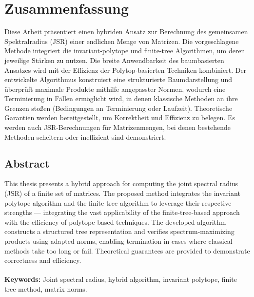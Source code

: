 \chapter*{Zusammenfassung}

Diese Arbeit präsentiert einen hybriden Ansatz zur Berechnung des gemeinsamen Spektralradius (JSR) einer endlichen Menge von Matrizen. Die vorgeschlagene Methode integriert die invariant-polytope und finite-tree Algorithmen, um deren jeweilige Stärken zu nutzen. Die breite Anwendbarkeit des baumbasierten Ansatzes wird mit der Effizienz der Polytop-basierten Techniken kombiniert. Der entwickelte Algorithmus konstruiert eine strukturierte Baumdarstellung und überprüft maximale Produkte mithilfe angepasster Normen, wodurch eine Terminierung in Fällen ermöglicht wird, in denen klassische Methoden an ihre Grenzen stoßen (Bedingungen an Terminierung oder Laufzeit). Theoretische Garantien werden bereitgestellt, um Korrektheit und Effizienz zu belegen. Es werden auch JSR-Berechnungen für Matrizenmengen, bei denen bestehende Methoden scheitern oder ineffizient sind demonstriert.

\vspace{1.3em} 					%
\section*{\huge Abstract} 	%
\vspace{1.3em} 					%

This thesis presents a hybrid approach for computing the joint spectral radius (JSR) of a finite set of matrices. The proposed method integrates the invariant polytope algorithm and the finite tree algorithm to leverage their respective strengths — integrating the vast applicability of the finite-tree-based approach with the efficiency of polytope-based techniques. The developed algorithm constructs a structured tree representation and verifies spectrum-maximizing products using adapted norms, enabling termination in cases where classical methods take too long or fail. Theoretical guarantees are provided to demonstrate correctness and efficiency. \\ \\
\textbf{Keywords:} Joint spectral radius, hybrid algorithm, invariant polytope, finite tree method, matrix norms.

